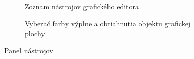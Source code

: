 \begin{figure}[H]
	\centering
	\begin{subfigure}[t]{0.48\linewidth}	
		\caption{Zoznam nástrojov grafického editora}
	\end{subfigure}
	\quad
	\begin{subfigure}[t]{0.48\linewidth}	
		\caption{Vyberač farby výplne a obtiahnutia objektu grafickej plochy}
	\end{subfigure}
	\caption{Panel nástrojov}
\end{figure}



